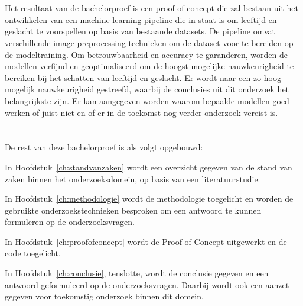 \section{}%
\label{sec:onderzoeksdoelstelling}

Het resultaat van de bachelorproef is een proof-of-concept die zal bestaan uit het ontwikkelen van een machine learning pipeline die in staat is om leeftijd en geslacht te voorspellen op basis van bestaande datasets. De pipeline omvat verschillende image preprocessing technieken om de dataset voor te bereiden op de modeltraining. Om betrouwbaarheid en accuracy te garanderen, worden de modellen verfijnd en geoptimaliseerd om de hoogst mogelijke nauwkeurigheid te bereiken bij het schatten van leeftijd en geslacht. Er wordt naar een zo hoog mogelijk nauwkeurigheid gestreefd, waarbij de conclusies uit dit onderzoek het belangrijkste zijn. Er kan aangegeven worden waarom bepaalde modellen goed werken of juist niet en of er in de toekomst nog verder onderzoek vereist is. 


\section{}%
\label{sec:opzet-bachelorproef}


De rest van deze bachelorproef is als volgt opgebouwd:

In Hoofdstuk~\ref{ch:standvanzaken} wordt een overzicht gegeven van de stand van zaken binnen het onderzoeksdomein, op basis van een literatuurstudie.

In Hoofdstuk~\ref{ch:methodologie} wordt de methodologie toegelicht en worden de gebruikte onderzoekstechnieken besproken om een antwoord te kunnen formuleren op de onderzoeksvragen.

In Hoofdstuk~\ref{ch:proofofconcept} wordt de Proof of Concept uitgewerkt en de code toegelicht. 

In Hoofdstuk~\ref{ch:conclusie}, tenslotte, wordt de conclusie gegeven en een antwoord geformuleerd op de onderzoeksvragen. Daarbij wordt ook een aanzet gegeven voor toekomstig onderzoek binnen dit domein.